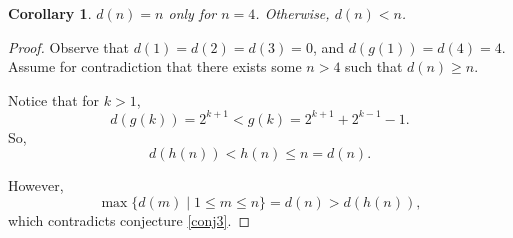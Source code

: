\documentclass{article}
\newtheorem{corollary}{Corollary}
\begin{document}
	\begin{corollary}
		$d(n) = n$ only for $n=4$.
		Otherwise, $d(n) < n$.
	\end{corollary}
	\begin{proof}
		Observe that $d(1) = d(2) = d(3) = 0$, and $d(g(1)) = d(4) = 4$. \\
		
		Assume for contradiction that there exists some $n > 4$ such that $d(n) \geq n$.
		
		Notice that for $k > 1$,
		\begin{equation*}
			d(g(k)) = 2^{k+1} < g(k) = 2^{k+1} + 2^{k-1} - 1.
		\end{equation*}
		So,
		\begin{equation*}
			d(h(n)) < h(n) \leq n = d(n).
		\end{equation*}
	
		However,
		\begin{equation*}
			\max \{d(m) \mid 1 \leq m \leq n\} = d(n) > d(h(n)),
		\end{equation*}
		which contradicts conjecture \ref{conj3}.
	\end{proof}
\end{document}
